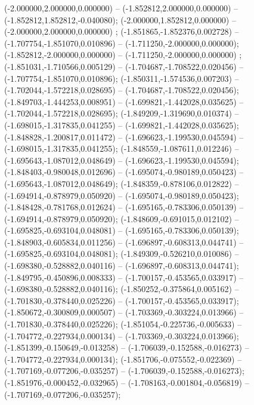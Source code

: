  (-2.000000,2.000000,0.000000) -- (-1.852812,2.000000,0.000000) -- (-1.852812,1.852812,-0.040080);
 (-2.000000,1.852812,0.000000) -- (-2.000000,2.000000,0.000000) ;
 (-1.851865,-1.852376,0.002728) -- (-1.707754,-1.851070,0.010896) -- (-1.711250,-2.000000,0.000000);
 (-1.852812,-2.000000,0.000000) -- (-1.711250,-2.000000,0.000000) ;
 (-1.851031,-1.710566,0.005129) -- (-1.704687,-1.708522,0.020456) -- (-1.707754,-1.851070,0.010896);
 (-1.850311,-1.574536,0.007203) -- (-1.702044,-1.572218,0.028695) -- (-1.704687,-1.708522,0.020456);
 (-1.849703,-1.444253,0.008951) -- (-1.699821,-1.442028,0.035625) -- (-1.702044,-1.572218,0.028695);
 (-1.849209,-1.319690,0.010374) -- (-1.698015,-1.317835,0.041255) -- (-1.699821,-1.442028,0.035625);
 (-1.848828,-1.200817,0.011472) -- (-1.696623,-1.199530,0.045594) -- (-1.698015,-1.317835,0.041255);
 (-1.848559,-1.087611,0.012246) -- (-1.695643,-1.087012,0.048649) -- (-1.696623,-1.199530,0.045594);
 (-1.848403,-0.980048,0.012696) -- (-1.695074,-0.980189,0.050423) -- (-1.695643,-1.087012,0.048649);
 (-1.848359,-0.878106,0.012822) -- (-1.694914,-0.878979,0.050920) -- (-1.695074,-0.980189,0.050423);
 (-1.848428,-0.781768,0.012624) -- (-1.695165,-0.783306,0.050139) -- (-1.694914,-0.878979,0.050920);
 (-1.848609,-0.691015,0.012102) -- (-1.695825,-0.693104,0.048081) -- (-1.695165,-0.783306,0.050139);
 (-1.848903,-0.605834,0.011256) -- (-1.696897,-0.608313,0.044741) -- (-1.695825,-0.693104,0.048081);
 (-1.849309,-0.526210,0.010086) -- (-1.698380,-0.528882,0.040116) -- (-1.696897,-0.608313,0.044741);
 (-1.849795,-0.450896,0.008333) -- (-1.700157,-0.453565,0.033917) -- (-1.698380,-0.528882,0.040116);
 (-1.850252,-0.375864,0.005162) -- (-1.701830,-0.378440,0.025226) -- (-1.700157,-0.453565,0.033917);
 (-1.850672,-0.300809,0.000507) -- (-1.703369,-0.303224,0.013966) -- (-1.701830,-0.378440,0.025226);
 (-1.851054,-0.225736,-0.005633) -- (-1.704772,-0.227934,0.000134) -- (-1.703369,-0.303224,0.013966);
 (-1.851399,-0.150649,-0.013258) -- (-1.706039,-0.152588,-0.016273) -- (-1.704772,-0.227934,0.000134);
 (-1.851706,-0.075552,-0.022369) -- (-1.707169,-0.077206,-0.035257) -- (-1.706039,-0.152588,-0.016273);
 (-1.851976,-0.000452,-0.032965) -- (-1.708163,-0.001804,-0.056819) -- (-1.707169,-0.077206,-0.035257);
